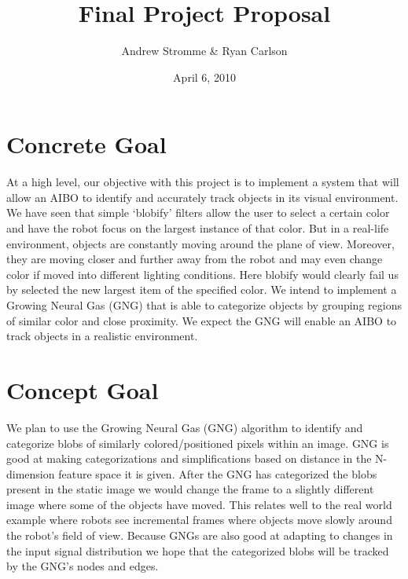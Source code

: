 \documentclass{article}
\begin{document}
\title{Final Project Proposal}
\author{Andrew Stromme \& Ryan Carlson}
\date{April 6, 2010}
\maketitle

\section{Concrete Goal}

At a high level, our objective with this project is to implement a system that will allow an AIBO to identify and accurately track objects in its visual environment. We have seen that simple `blobify' filters allow the user to select a certain color and have the robot focus on the largest instance of that color. But in a real-life environment, objects are constantly moving around the plane of view. Moreover, they are moving closer and further away from the robot and may even change color if moved into different lighting conditions. Here blobify would clearly fail us by selected the new largest item of the specified color. We intend to implement a Growing Neural Gas (GNG) that is able to categorize objects by grouping regions of similar color and close proximity. We expect the GNG will enable an AIBO to track objects in a realistic environment.

\section{Concept Goal}
We plan to use the Growing Neural Gas (GNG) algorithm to identify and categorize blobs of similarly colored/positioned pixels within an image. GNG is good at making categorizations and simplifications based on distance in the N-dimension feature space it is given. After the GNG has categorized the blobs present in the static image we would change the frame to a slightly different image where some of the objects have moved. This relates well to the real world example where robots see incremental frames where objects move slowly around the robot's field of view. Because GNGs are also good at adapting to changes in the input signal distribution we hope that the categorized blobs will be tracked by the GNG's nodes and edges.
\end{document}
